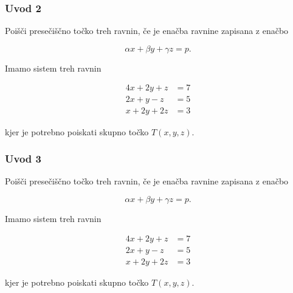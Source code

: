 \documentclass[8pt,aspectratio=169]{beamer} %
\begin{document}
\begin{frame}[plain,noframenumbering,label=newsubsection]
	\vfill
	\begin{center}
		\textbf{\insertsubsectionhead}
	\end{center}
	\vfill
\end{frame}


\begin{frame}
	\frametitle{Uvod 2}
	
	 Poišči presečiščno točko treh ravnin, če je enačba ravnine zapisana z enačbo
	
	\[
	\alpha x + \beta y + \gamma z = p.
	\]
	
	 Imamo sistem treh ravnin
	
	\begin{equation} \label{eq:plane_system}
		\begin{split}
			4 x + 2 y + z & = 7\\
			2 x + y - z & = 5\\
			x + 2 y + 2 z & = 3
		\end{split}	
	\end{equation}
	
	kjer je potrebno poiskati skupno točko $T(x,y,z)$.
\end{frame}


\begin{frame}
	\frametitle{Uvod 3}
	
	 Poišči presečiščno točko treh ravnin, če je enačba ravnine zapisana z enačbo
	
	\[
	\alpha x + \beta y + \gamma z = p.
	\]
	
	 Imamo sistem treh ravnin
	
	\begin{equation} \label{eq:plane_system}
		\begin{split}
			4 x + 2 y + z & = 7\\
			2 x + y - z & = 5\\
			x + 2 y + 2 z & = 3
		\end{split}	
	\end{equation}
	
	kjer je potrebno poiskati skupno točko $T(x,y,z)$.
\end{frame}


\end{document}
